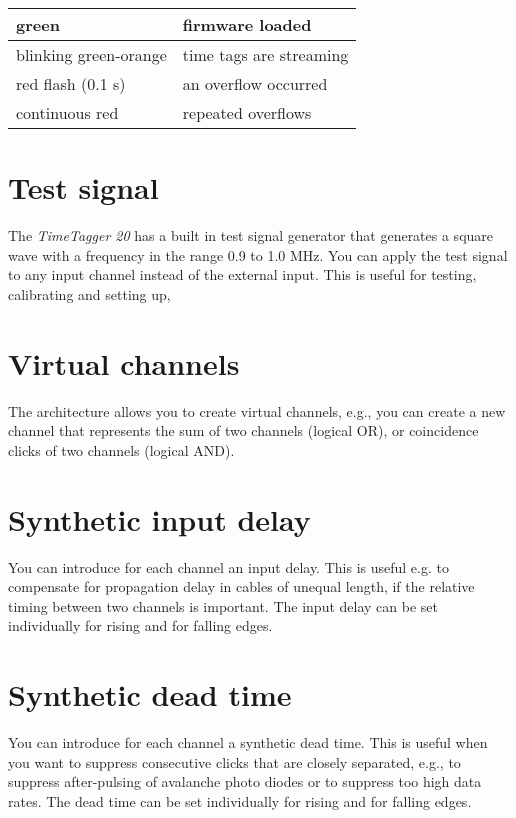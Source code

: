 \documentclass[letterpaper,10pt,english]{sphinxmanual}
\begin{document}
\noindent\begin{tabulary}{\linewidth}{|L|L|}
\hline

green
 & 
firmware loaded
\\
\hline
blinking green-orange
 & 
time tags are streaming
\\
\hline
red flash (0.1 s)
 & 
an overflow occurred
\\
\hline
continuous red
 & 
repeated overflows
\\
\hline\end{tabulary}



\section{Test signal}
\label{sections/hardware:test-signal}
The \emph{TimeTagger 20} has a built in test signal generator that
generates a square wave with a frequency in the range 0.9 to 1.0 MHz.
You can apply the test signal to any input channel instead of the
external input. This is useful for testing, calibrating and setting up,


\section{Virtual channels}
\label{sections/hardware:virtual-channels}
The architecture allows you to create virtual channels, e.g.,
you can create a new channel that represents the sum of two channels (logical OR),
or coincidence clicks of two channels (logical AND).


\section{Synthetic input delay}
\label{sections/hardware:synthetic-input-delay}
You can introduce for each channel an input delay. This is useful
e.g. to compensate for propagation delay in cables of unequal length,
if the relative timing between two channels is important. The input delay
can be set individually for rising and for falling edges.


\section{Synthetic dead time}
\label{sections/hardware:synthetic-dead-time}
You can introduce for each channel a synthetic dead time. This is useful
when you want to suppress consecutive clicks that are closely separated,
e.g., to suppress after-pulsing of avalanche photo diodes or to suppress too
high data rates. The dead time can be set individually for rising and for falling edges.
\end{document}

